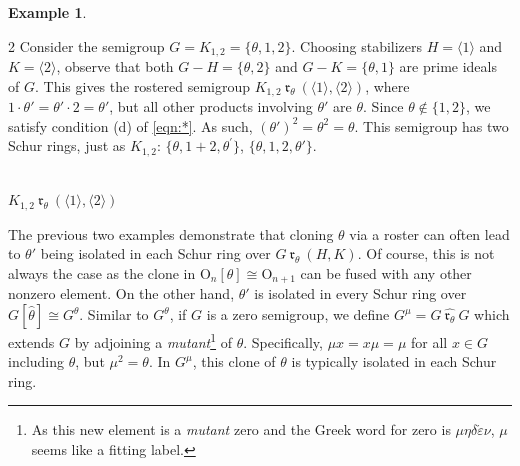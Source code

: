 \documentclass{article}
\theoremstyle{plain}
\theoremstyle{definition}
\newtheorem{Exam}[Thm]{Example}
\renewcommand{\O}{\mathrm{O}}
\renewcommand{\r}[1]{\ \mathfrak{r}_{#1}\ }
\newcommand{\rhat}[1]{\ \widehat{\mathfrak{r}_{#1}}\ }
\begin{document}
\begin{Exam}
\begin{multicols}{2}
Consider the semigroup $G=K_{1,2} = \{\theta, 1, 2\}$. Choosing stabilizers $H=\langle 1\rangle$ and $K=\langle 2\rangle$, observe that both $G-H=\{\theta,2\}$ and $G-K=\{\theta,1\}$ are prime ideals of $G$. This gives the rostered semigroup $K_{1,2} \r\theta (\langle 1\rangle, \langle 2\rangle)$, where $1\cdot \theta' =\theta'\cdot 2 = \theta'$, but all other products involving $\theta'$ are $\theta$. Since $\theta\not\in \{1, 2\}$, we satisfy condition (d) of \eqref{eqn:*}. As such, $\left(\theta'\right)^2 = \theta^2=\theta$. This semigroup has two Schur rings, just as $K_{1,2}$: $\{\theta, 1+2, \theta^\prime\}$, $\{\theta, 1,2, \theta'\}$.

\begin{center}
\\$K_{1,2}\r\theta(\langle 1\rangle, \langle 2\rangle)$
\end{center}
\end{multicols}
\end{Exam}

The previous two examples demonstrate that cloning $\theta$ via a roster can often lead to $\theta'$ being isolated in each Schur ring over $G\r\theta (H,K)$. Of course, this is not always the case as the clone in $\O_n[\theta]\cong \O_{n+1}$ can be fused with any other nonzero element. On the other hand, $\theta'$ is isolated in every Schur ring over $G[\hat{\theta}]\cong G^\theta$. Similar to $G^\theta$, if $G$ is a zero semigroup, we define \label{dualclone}$G^\mu = G\rhat\theta G$ which extends $G$ by adjoining a \emph{mutant}\footnote{As this new element is a \emph{mutant} zero and the Greek word for zero is $\mu\eta\delta\acute\varepsilon\nu$, $\mu$ seems like a fitting label.} of $\theta$. Specifically, $\mu x = x\mu = \mu$ for all $x\in G$ including $\theta$, but $\mu^2=\theta$. In $G^\mu$, this clone of $\theta$ is typically isolated in each Schur ring.
\end{document}
